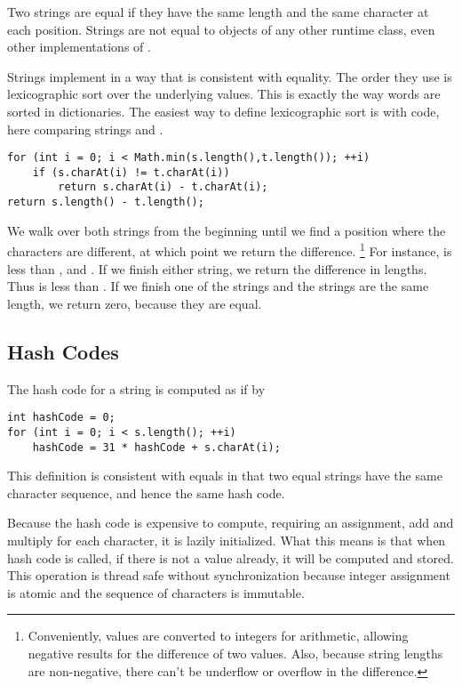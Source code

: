 Two strings are equal if they have the same length and the same
character at each position.  Strings are not equal to objects of any
other runtime class, even other implementations of .

Strings implement  in a way that is
consistent with equality.  The order they use is lexicographic
sort over the underlying  values.  This is exactly the
way words are sorted in dictionaries.  The easiest way to define
lexicographic sort is with code, here comparing strings 
and .
%
\begin{verbatim}
for (int i = 0; i < Math.min(s.length(),t.length()); ++i)
    if (s.charAt(i) != t.charAt(i))
        return s.charAt(i) - t.charAt(i);
return s.length() - t.length();
\end{verbatim}

We walk over both strings from the beginning until we find a position
where the characters are different, at which point we return the
difference.%
%
\footnote{Conveniently,  values are converted to integers
  for arithmetic, allowing negative results for the difference of two
  values.  Also, because string lengths are non-negative, there can't
  be underflow or overflow in the difference.}
%
For instance,  is less than 
, and .  If we finish either string, we
return the difference in lengths.  Thus  is less than
.  If we finish one of the strings and the strings are
the same length, we return zero, because they are equal.

\subsection{Hash Codes}

The hash code for a string  is computed as if by
%
\begin{verbatim}
int hashCode = 0;
for (int i = 0; i < s.length(); ++i)
    hashCode = 31 * hashCode + s.charAt(i);
\end{verbatim}
%
This definition is consistent with equals in that two equal strings
have the same character sequence, and hence the same hash code.

Because the hash code is expensive to compute, requiring an
assignment, add and multiply for each character, it is lazily
initialized.  What this means is that when hash code is called, if
there is not a value already, it will be computed and stored. This
operation is thread safe without synchronization because integer
assignment is atomic and the sequence of characters is immutable.

